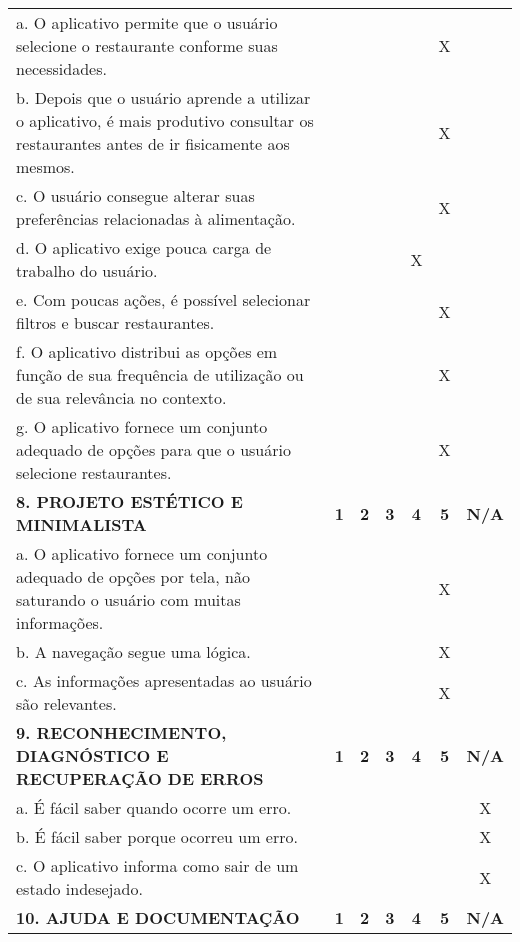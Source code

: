 \documentclass[portuguese,oneside]{tcc}
\begin{document}
\begin{center}
\begin{longtabu}{|L{25em}|c|c|c|c|c|c|}
																		a. O aplicativo permite que o usuário selecione o restaurante conforme suas necessidades. & & & & & X & \\ 
																		b. Depois que o usuário aprende a utilizar o aplicativo, é mais produtivo consultar os restaurantes antes de ir fisicamente aos mesmos. & & & & & X & \\ 
																		c. O usuário consegue alterar suas preferências relacionadas à alimentação. & & & & & X & \\ 
																		d. O aplicativo exige pouca carga de trabalho do usuário. & & & & X & & \\ 
																		e. Com poucas ações, é possível selecionar filtros e buscar restaurantes. & & & & & X & \\ 
																		f. O aplicativo distribui as opções em função de sua frequência de utilização ou de sua relevância no contexto.	& & & & & X & \\ 
																		g. O aplicativo fornece um conjunto adequado de opções para que o usuário selecione restaurantes. & & & & & X & \\ 
																		\textbf{8. PROJETO ESTÉTICO E MINIMALISTA} & \textbf{1} & \textbf{2} & \textbf{3} & \textbf{4} & \textbf{5} & \textbf{N/A} \\ 
																		a. O aplicativo fornece um conjunto adequado de opções por tela, não saturando o usuário com muitas informações. & & & & & X & \\ 
																		b. A navegação segue uma lógica. & & & & & X & \\ 
																		c. As informações apresentadas ao usuário são relevantes. & & & & & X & \\ 
																		\textbf{9. RECONHECIMENTO, DIAGNÓSTICO E RECUPERAÇÃO DE ERROS} & \textbf{1} & \textbf{2} & \textbf{3} & \textbf{4} & \textbf{5} & \textbf{N/A} \\ 
																		a. É fácil saber quando ocorre um erro.	& & & & & & X \\ 
																		b. É fácil saber porque ocorreu um erro. & & & & & & X \\ 
																		c. O aplicativo informa como sair de um estado indesejado. & & & & & & X \\ 
																		\textbf{10. AJUDA E DOCUMENTAÇÃO} & \textbf{1} & \textbf{2} & \textbf{3} & \textbf{4} & \textbf{5} & \textbf{N/A} \\ 

\end{longtabu}
\end{center}
\end{document}
